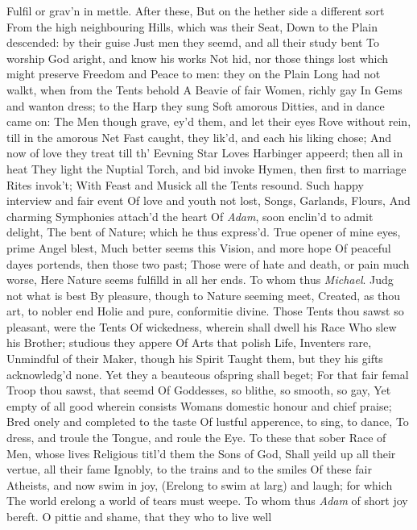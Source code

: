 \documentclass[11pt]{book}
\newcounter {first}
\begin{document}
Fulfil or grav'n in mettle.  After these, 
But on the hether side a different sort 
From the high neighbouring Hills, which was their Seat, 
Down to the Plain descended: by their guise 
Just men they seemd, and all their study bent 
To worship God aright, and know his works 
Not hid, nor those things lost which might preserve 
Freedom and Peace to men: they on the Plain 
Long had not walkt, when from the Tents behold 
A Beavie of fair Women, richly gay 
In Gems and wanton dress; to the Harp they sung 
Soft amorous Ditties, and in dance came on: 
The Men though grave, ey'd them, and let their eyes 
Rove without rein, till in the amorous Net 
Fast caught, they lik'd, and each his liking chose; 
And now of love they treat till th' Eevning Star 
Loves Harbinger appeerd; then all in heat 
They light the Nuptial Torch, and bid invoke 
Hymen, then first to marriage Rites invok't; 
With Feast and Musick all the Tents resound. 
Such happy interview and fair event 
Of love and youth not lost, Songs, Garlands, Flours, 
And charming Symphonies attach'd the heart 
Of \textit{Adam}, soon enclin'd to admit delight, 
The bent of Nature; which he thus express'd. 
\quad True opener of mine eyes, prime Angel blest, 
Much better seems this Vision, and more hope 
Of peaceful dayes portends, then those two past; 
Those were of hate and death, or pain much worse, 
Here Nature seems fulfilld in all her ends. 
\quad To whom thus \textit{Michael}.  Judg not what is best 
By pleasure, though to Nature seeming meet, 
Created, as thou art, to nobler end 
Holie and pure, conformitie divine. 
Those Tents thou sawst so pleasant, were the Tents 
Of wickedness, wherein shall dwell his Race 
Who slew his Brother; studious they appere 
Of Arts that polish Life, Inventers rare, 
Unmindful of their Maker, though his Spirit 
Taught them, but they his gifts acknowledg'd none. 
Yet they a beauteous ofspring shall beget; 
For that fair femal Troop thou sawst, that seemd 
Of Goddesses, so blithe, so smooth, so gay, 
Yet empty of all good wherein consists 
Womans domestic honour and chief praise; 
Bred onely and completed to the taste 
Of lustful apperence, to sing, to dance, 
To dress, and troule the Tongue, and roule the Eye. 
To these that sober Race of Men, whose lives 
Religious titl'd them the Sons of God, 
Shall yeild up all their vertue, all their fame 
Ignobly, to the trains and to the smiles 
Of these fair Atheists, and now swim in joy, 
(Erelong to swim at larg) and laugh; for which 
The world erelong a world of tears must weepe. 
\quad To whom thus \textit{Adam} of short joy bereft. 
O pittie and shame, that they who to live well 
\end{document}
